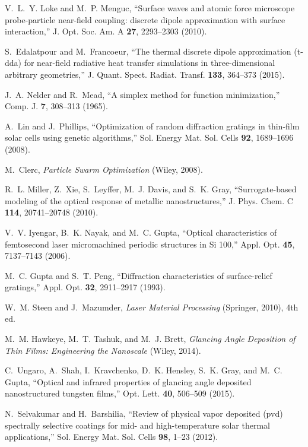 \documentclass[10pt,letterpaper]{article}
\begin{document}
\begin{thebibliography}{100}
V.~L.~Y. Loke and M.~P. Menguc, \enquote{Surface waves and atomic force
  microscope probe-particle near-field coupling: discrete dipole approximation
  with surface interaction,} J. Opt. Soc. Am. A \textbf{27}, 2293--2303 (2010).

S.~Edalatpour and M.~Francoeur, \enquote{The thermal discrete dipole
  approximation (t-dda) for near-field radiative heat transfer simulations in
  three-dimensional arbitrary geometries,} J. Quant. Spect. Radiat. Transf.
  \textbf{133}, 364--373 (2015).

J.~A. Nelder and R.~Mead, \enquote{A simplex method for function minimization,}
  Comp. J. \textbf{7}, 308--313 (1965).

A.~Lin and J.~Phillips, \enquote{Optimization of random diffraction gratings in
  thin-film solar cells using genetic algorithms,} Sol. Energy Mat. Sol. Cells
  \textbf{92}, 1689--1696 (2008).

M.~Clerc, \emph{Particle Swarm Optimization} (Wiley, 2008).

R.~L. Miller, Z.~Xie, S.~Leyffer, M.~J. Davis, and S.~K. Gray,
  \enquote{Surrogate-based modeling of the optical response of metallic
  nanostructures,} J. Phys. Chem. C \textbf{114}, 20741--20748 (2010).

V.~V. Iyengar, B.~K. Nayak, and M.~C. Gupta, \enquote{Optical characteristics
  of femtosecond laser micromachined periodic structures in {S}i 100,} Appl.
  Opt. \textbf{45}, 7137--7143 (2006).

M.~C. Gupta and S.~T. Peng, \enquote{Diffraction characteristics of
  surface-relief gratings,} Appl. Opt. \textbf{32}, 2911--2917 (1993).

W.~M. Steen and J.~Mazumder, \emph{Laser Material Processing} (Springer, 2010),
  4th ed.

M.~M. Hawkeye, M.~T. Tashuk, and M.~J. Brett, \emph{Glancing Angle Deposition
  of Thin Films: Engineering the Nanoscale} (Wiley, 2014).

C.~Ungaro, A.~Shah, I.~Kravchenko, D.~K. Hensley, S.~K. Gray, and M.~C. Gupta,
  \enquote{Optical and infrared properties of glancing angle deposited
  nanostructured tungsten films,} Opt. Lett. \textbf{40}, 506--509 (2015).

N.~Selvakumar and H.~Barshilia, \enquote{Review of physical vapor deposited
  (pvd) spectrally selective coatings for mid- and high-temperature solar
  thermal applications,} Sol. Energy Mat. Sol. Cells \textbf{98}, 1--23 (2012).


\end{thebibliography}
\end{document}
